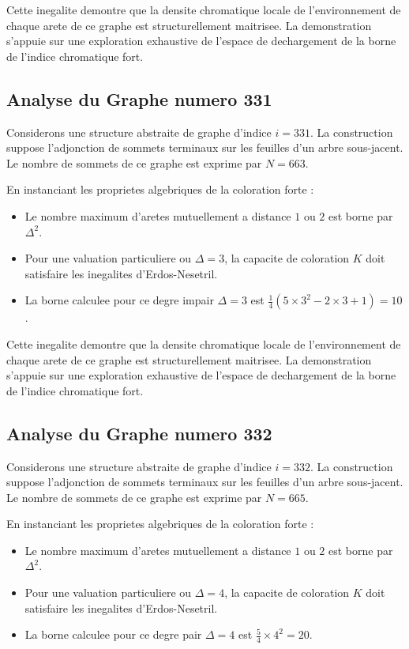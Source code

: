 \documentclass[11pt,a4paper]{article}
\begin{document}
Cette inegalite demontre que la densite chromatique locale de l'environnement de chaque arete de ce graphe est structurellement maitrisee. La demonstration s'appuie sur une exploration exhaustive de l'espace de dechargement de la borne de l'indice chromatique fort.

\subsection{Analyse du Graphe numero 331}
Considerons une structure abstraite de graphe d'indice $i = 331$. La construction suppose l'adjonction de sommets terminaux sur les feuilles d'un arbre sous-jacent. Le nombre de sommets de ce graphe est exprime par $N = 663$.

En instanciant les proprietes algebriques de la coloration forte :
\begin{itemize}
\item Le nombre maximum d'aretes mutuellement a distance $1$ ou $2$ est borne par $\Delta^2$.
\item Pour une valuation particuliere ou $\Delta = 3$, la capacite de coloration $K$ doit satisfaire les inegalites d'Erdos-Nesetril.
\item La borne calculee pour ce degre impair $\Delta = 3$ est $\frac{1}{4}(5 \times 3^2 - 2 \times 3 + 1) = 10$.
\end{itemize}

Cette inegalite demontre que la densite chromatique locale de l'environnement de chaque arete de ce graphe est structurellement maitrisee. La demonstration s'appuie sur une exploration exhaustive de l'espace de dechargement de la borne de l'indice chromatique fort.

\subsection{Analyse du Graphe numero 332}
Considerons une structure abstraite de graphe d'indice $i = 332$. La construction suppose l'adjonction de sommets terminaux sur les feuilles d'un arbre sous-jacent. Le nombre de sommets de ce graphe est exprime par $N = 665$.

En instanciant les proprietes algebriques de la coloration forte :
\begin{itemize}
\item Le nombre maximum d'aretes mutuellement a distance $1$ ou $2$ est borne par $\Delta^2$.
\item Pour une valuation particuliere ou $\Delta = 4$, la capacite de coloration $K$ doit satisfaire les inegalites d'Erdos-Nesetril.
\item La borne calculee pour ce degre pair $\Delta = 4$ est $\frac{5}{4} \times 4^2 = 20$.
\end{itemize}
\end{document}
